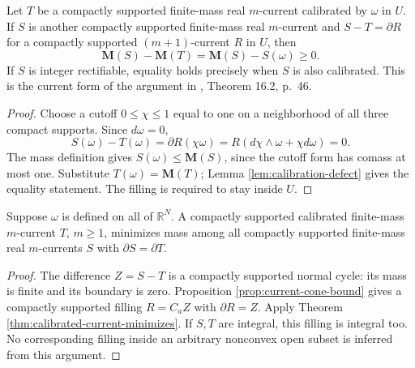 \begin{theorem}\label{thm:calibrated-current-minimizes}
Let $T$ be a compactly supported finite-mass real $m$-current calibrated by $\omega$ in $U$. If $S$ is another compactly supported finite-mass real $m$-current and $S-T=\partial R$ for a compactly supported $(m+1)$-current $R$ in $U$, then
\[
 \mathbf M(S)-\mathbf M(T)=\mathbf M(S)-S(\omega)\geq0.
\]
If $S$ is integer rectifiable, equality holds precisely when $S$ is also calibrated. This is the current form of the argument in \cite{ChMin}, Theorem 16.2, p.~46.
\end{theorem}
\begin{proof}
Choose a cutoff $0\leq\chi\leq1$ equal to one on a neighborhood of all three compact supports. Since $d\omega=0$,
\[
 S(\omega)-T(\omega)=\partial R(\chi\omega)
 =R(d\chi\wedge\omega+\chi d\omega)=0.
\]
The mass definition gives $S(\omega)\leq\mathbf M(S)$, since the cutoff form has comass at most one. Substitute $T(\omega)=\mathbf M(T)$; Lemma \ref{lem:calibration-defect} gives the equality statement. The filling is required to stay inside $U$.
\end{proof}

\begin{corollary}\label{cor:calibrated-euclidean-boundary}
Suppose $\omega$ is defined on all of $\mathbb R^N$. A compactly supported calibrated finite-mass $m$-current $T$, $m\geq1$, minimizes mass among all compactly supported finite-mass real $m$-currents $S$ with $\partial S=\partial T$.
\end{corollary}
\begin{proof}
The difference $Z=S-T$ is a compactly supported normal cycle: its mass is finite and its boundary is zero. Proposition \ref{prop:current-cone-bound} gives a compactly supported filling $R=C_aZ$ with $\partial R=Z$. Apply Theorem \ref{thm:calibrated-current-minimizes}. If $S,T$ are integral, this filling is integral too. No corresponding filling inside an arbitrary nonconvex open subset is inferred from this argument.
\end{proof}

